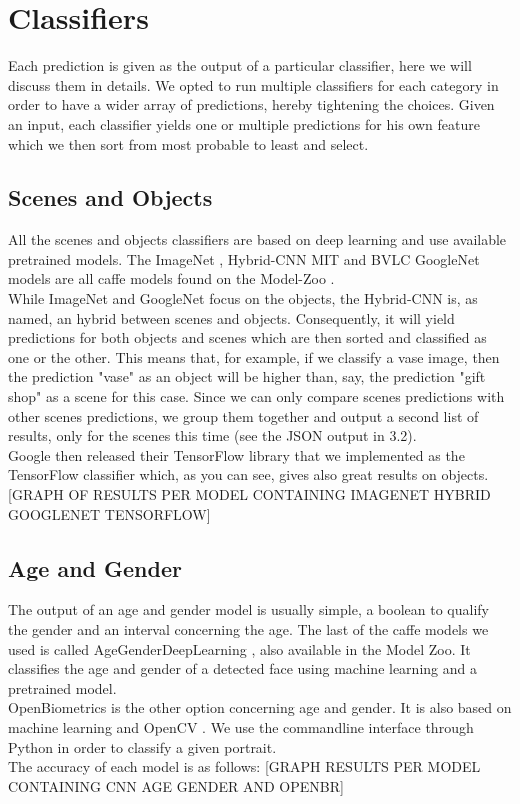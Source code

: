 \documentclass{article}
\begin{document}
\section{Classifiers}
    Each prediction is given as the output of a particular classifier, here we will discuss them in details. We opted to run multiple classifiers for each category in order to have a wider array of predictions, hereby tightening the choices. Given an input, each classifier yields one or multiple predictions for his own feature which we then sort from most probable to least and select.
    \subsection{Scenes and Objects}
        All the scenes and objects classifiers are based on deep learning and use available pretrained models.
        The ImageNet \cite{imnet}, Hybrid-CNN MIT \cite{hybrid} and BVLC GoogleNet models are all caffe models found on the Model-Zoo \cite{zoo}. 
        \\While ImageNet and GoogleNet focus on the objects, the Hybrid-CNN is, as named, an hybrid between scenes and objects. Consequently, it will yield predictions for both objects and scenes which are then sorted and classified as one or the other. This means that, for example, if we classify a vase image, then the prediction "vase" as an object will be higher than, say, the prediction "gift shop" as a scene for this case. Since we can only compare scenes predictions with other scenes predictions, we group them together and output a second list of results, only for the scenes this time (see the JSON output in 3.2).
        \\Google then released their TensorFlow \cite{tensor} library that we implemented as the TensorFlow classifier which, as you can see, gives also great results on objects.
        [GRAPH OF RESULTS PER MODEL CONTAINING IMAGENET HYBRID GOOGLENET TENSORFLOW]
    \subsection{Age and Gender}
        The output of an age and gender model is usually simple, a boolean to qualify the gender and an interval concerning the age.
        The last of the caffe models we used is called AgeGenderDeepLearning \cite{age}, also available in the Model Zoo. It classifies the age and gender of a detected face using machine learning and a pretrained model.
        \\OpenBiometrics \cite{openbr} is the other option concerning age and gender. It is also based on machine learning and OpenCV \cite{opencv}. We use the commandline interface through Python in order to classify a given portrait.
        \\The accuracy of each model is as follows:
        [GRAPH RESULTS PER MODEL CONTAINING CNN AGE GENDER AND OPENBR]
\end{document}
